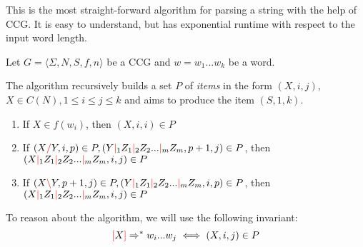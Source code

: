 \documentclass[12pt]{extarticle}
\theoremstyle{definition} \newtheorem{defn}{Definition}
\theoremstyle{definition} \newtheorem{prop}{Proposition}
\newcommand{\lc}{\textcolor{red}{\backslash}}
\newcommand{\rc}{\textcolor{red}{/}}
\newcommand{\mc}{\textcolor{red}{|}}
\newcommand{\lb}{\textcolor{red}{[}}
\newcommand{\rb}{\textcolor{red}{]}}
\begin{document}
This is the most straight-forward algorithm for parsing a string with the help
of CCG. It is easy to understand, but has exponential runtime with respect to
the input word length.

Let $ G = \langle \Sigma, N, S, f, n \rangle $ be a CCG and $w = w_1 ... w_k$
be a word.

The algorithm recursively builds a set $P$ of \emph{items} in the form
$(X, i, j)$, $X \in C(N), 1 \leq i \leq j \leq k$ and aims to produce the item
$(S, 1, k)$.

\begin{enumerate}
    \item If $X \in f(w_i)$, then $(X, i, i) \in P$
    \item If $(X \rc Y, i, p) \in P, (Y \mc_1 Z_1 \mc_2 Z_2 ... \mc_m Z_m, p + 1, j) \in P$,
        then $(X \mc_1 Z_1 \mc_2 Z_2 ... \mc_m Z_m, i, j) \in P$
    \item If $(X \lc Y, p + 1, j) \in P, (Y \mc_1 Z_1 \mc_2 Z_2 ... \mc_m Z_m, i, p) \in P$,
        then $(X \mc_1 Z_1 \mc_2 Z_2 ... \mc_m Z_m, i, j) \in P$
\end{enumerate}

To reason about the algorithm, we will use the following invariant:
\begin{equation}
    \lb X \rb \Rightarrow^* w_i ... w_j \iff (X, i, j) \in P
\end{equation}
\end{document}
